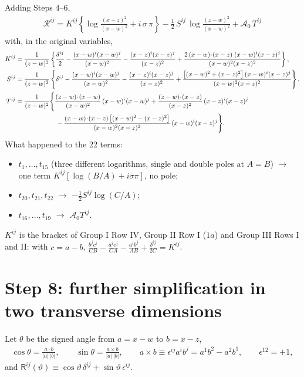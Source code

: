 \documentclass[10pt]{article}
\numberwithin{equation}{section}
\begin{document}
Adding Steps 4--6,
\begin{align}
\boxed{\;\mathcal{R}^{ij}=K^{ij}\left\{\log\frac{(x-z)^{2}}{(x-w)^{2}}+i\,\sigma\,\pi\right\}
-\frac12\,S^{ij}\,\log\frac{(z-w)^{2}}{(x-w)^{2}}+\mathcal{A}_{0}\,T^{ij}\;}
\end{align}
with, in the original variables,
\begin{align}
K^{ij}&=\frac{1}{(z-w)^{2}}\left\{\frac{\delta^{ij}}{2}-\frac{(x-w)^{i}(x-w)^{j}}{(x-w)^{2}}-\frac{(x-z)^{i}(x-z)^{j}}{(x-z)^{2}}+\frac{2\,(x-w)\!\cdot\!(x-z)\;(x-w)^{i}(x-z)^{j}}{(x-w)^{2}(x-z)^{2}}\right\},\notag\\
S^{ij}&=\frac{1}{(z-w)^{2}}\left\{\delta^{ij}-\frac{(x-w)^{i}(x-w)^{j}}{(x-w)^{2}}-\frac{(x-z)^{i}(x-z)^{j}}{(x-z)^{2}}+\frac{\big[(x-w)^{2}+(x-z)^{2}\big]\,(x-w)^{i}(x-z)^{j}}{(x-w)^{2}(x-z)^{2}}\right\},\notag\\
T^{ij}&=\frac{1}{(z-w)^{2}}\Bigg\{\frac{(z-w)\!\cdot\!(x-w)}{(x-w)^{2}}\,(x-w)^{i}(x-w)^{j}+\frac{(z-w)\!\cdot\!(x-z)}{(x-z)^{2}}\,(x-z)^{i}(x-z)^{j}\notag\\
&\hspace{2.2cm}-\frac{(x-w)\!\cdot\!(x-z)\,\big[(x-w)^{2}-(x-z)^{2}\big]}{(x-w)^{2}(x-z)^{2}}\,(x-w)^{i}(x-z)^{j}\Bigg\}. \label{eq:KST}
\end{align}
What happened to the 22 terms:
\begin{itemize}
\item $t_{1},\dots,t_{15}$ (three different logarithms, single and double poles at $A=B$) $\to$ one term $K^{ij}[\log(B/A)+i\sigma\pi]$, no pole;
\item $t_{20},t_{21},t_{22}$ $\to$ $-\tfrac12S^{ij}\log(C/A)$;
\item $t_{16},\dots,t_{19}$ $\to$ $\mathcal{A}_{0}T^{ij}$.
\end{itemize}
$K^{ij}$ is the bracket of Group I Row IV, Group II Row I ($1a$) and Group III Rows I and II: with $c=a-b$,
$\frac{b^{j}c^{i}}{CB}-\frac{a^{i}c^{j}}{CA}-\frac{a^{i}b^{j}}{AB}+\frac{\delta^{ij}}{2C}=K^{ij}$.

\section{Step 8: further simplification in two transverse dimensions}

Let $\theta$ be the signed angle from $a=x-w$ to $b=x-z$,
\begin{align}
\cos\theta=\frac{a\cdot b}{|a|\,|b|},\qquad\sin\theta=\frac{a\times b}{|a|\,|b|},\qquad a\times b\equiv\epsilon^{ij}a^{i}b^{j}=a^{1}b^{2}-a^{2}b^{1},\qquad\epsilon^{12}=+1,
\end{align}
and $\mathsf{R}^{ij}(\vartheta)\equiv\cos\vartheta\,\delta^{ij}+\sin\vartheta\,\epsilon^{ij}$.
\end{document}
